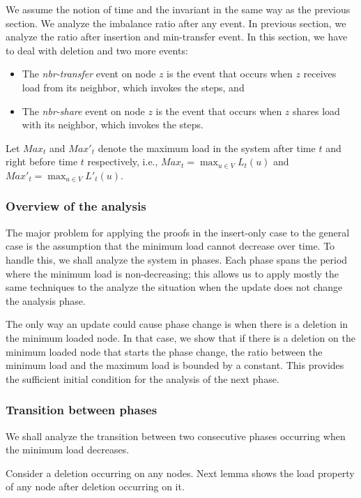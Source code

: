 \documentclass[a4paper]{article}
\begin{document}
We assume the notion of time and the invariant in the same way as the
previous section. We analyze the imbalance ratio after any event.
In previous section, we analyze the ratio after insertion and
min-transfer event. In this section, we have to deal with deletion
and two more events:
\begin{itemize}
\item The \textit{nbr-transfer} event on node $z$ is the event that
  occurs when $z$ receives load from its neighbor, which invokes the
  {\splitmax} steps, and
\item The \textit{nbr-share} event on node $z$ is the event that occurs
  when $z$ shares load with its neighbor, which invokes the
  {\splitnbr} steps.
\end{itemize}

Let $Max_t$ and $Max'_t$ denote the maximum load in the system after
time $t$ and right before time $t$ respectively, i.e., $Max_t
=\max_{u\in V} L_t(u)$ and $Max'_t =\max_{u\in V} L'_t(u)$.

\subsubsection{Overview of the analysis}
The major problem for applying the proofs in the insert-only case to
the general case is the assumption that the minimum load cannot
decrease over time.  To handle this, we shall analyze the system in
phases.  Each phase spans the period where the minimum load is non-decreasing;
this allows us to apply mostly the same techniques to the analyze the situation 
when the update does not change the analysis phase.

The only way an update could cause phase change is when there is a deletion
in the minimum loaded node.  In that case, we show that if there is a deletion 
on the minimum loaded node that starts the phase change, the ratio between 
the minimum load and the maximum load is bounded by a constant.  This provides
the sufficient initial condition for the analysis of the next phase.

\subsubsection{Transition between phases}

We shall analyze the transition between two consecutive phases
occurring when the minimum load decreases. 

Consider a deletion occurring on
any nodes. Next lemma shows the load property of any node after
deletion occurring on it.
\end{document}
